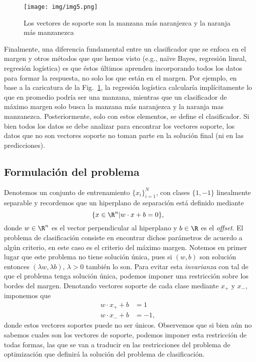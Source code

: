 \noindent{}

\begin{figure}[ht]
    \centering
    \texttt{[image: img/img5.png]}
    \caption{Los vectores de soporte son la manzana más naranjezca y la naranja más manzanezca}
    \label{fig:manzanas}
\end{figure}


Finalmente, una diferencia fundamental entre un clasificador que se enfoca en el margen y otros métodos que que hemos visto (e.g., na\"ive Bayes, regresión lineal, regresión logística) es que éstos últimos aprenden incorporando todos los datos para formar la respuesta, no solo los que están en el margen. Por ejemplo, en base a la caricatura de la Fig.~\ref{fig:manzanas}, la regresión logística calcularía implícitamente lo que en promedio podría ser una manzana, mientras que un clasificador de máximo margen solo busca la manzana más naranjezca y la naranja mas manzanezca. Posteriormente, solo con estos elementos, se define el clasificador.  Si bien todos los datos se debe analizar para encontrar los vectores soporte, los datos que no son vectores soporte no toman parte en la solución final (ni en las predicciones).

\subsection{Formulación del problema}

Denotemos un conjunto de entrenamiento $\{x_i\}_{i=1}^N$, con clases $\{1,-1\}$ linealmente separable y recordemos que un hiperplano de separación está definido mediante
\begin{equation}
    \{x\in \R^n | w\cdot x + b = 0 \},\label{ec:hiperplano_svm}
\end{equation}
donde $w\in \R^n$ es el vector perpendicular al hiperplano y $b\in \R$ es el \emph{offset}. El problema de clasificación consiste en encontrar dichos parámetros de acuerdo a algún criterio, en este caso es el criterio del máximo margen. Notemos en primer lugar que este problema no tiene solución única, pues si $(w,b)$ son solución entonces $(\lambda w, \lambda b)$, $\lambda>0$ también lo son. Para evitar esta \emph{invarianza} con tal de que el problema tenga solución única, podemos imponer una restricción sobre los bordes del margen. Denotando vectores soporte de cada clase mediante $x_{+}$ y $x_{-}$, imponemos que 
\begin{align}
 	w\cdot x_{+} + b &= 1 \label{ec:borde_svm1}\\
 	w\cdot x_{-} + b &=  -1,\label{ec:borde_svm2}
 \end{align}
 donde estos vectores soportes puede no ser únicos. Observemos que si bien aún no sabemos cuales son los vectores de soporte, podemos imponer esta restricción de todas formas, las que se van a traducir en las restricciones del problema de optimización que definirá la solución del problema de clasificación. 

